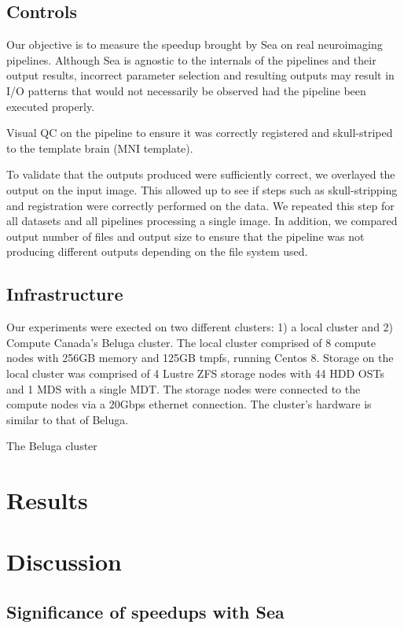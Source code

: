 \documentclass[10pt,journal,compsoc]{IEEEtran}
\begin{document}
\subsection{Controls}
Our objective is to measure the speedup brought by Sea on real neuroimaging pipelines.
Although Sea is agnostic to the internals of the pipelines and their output results, incorrect parameter
selection and resulting outputs may result in I/O patterns that would not necessarily be observed had the
pipeline been executed properly.

Visual QC on the pipeline to ensure it was correctly registered and skull-striped to the template brain (MNI template). 

To validate that the outputs produced were sufficiently correct, we overlayed the output on the input image.
This allowed up to see if steps such as skull-stripping and registration were correctly performed on the data.
We repeated this step for all datasets and all pipelines processing a single image. In addition, we compared output
number of files and output size to ensure that the pipeline was not producing different outputs depending on the file
system used.


\subsection{Infrastructure}

Our experiments were exected on two different clusters: 1) a local cluster and 2) Compute Canada's Beluga cluster.
The local cluster comprised of 8 compute nodes with 256GB memory and 125GB tmpfs, running Centos 8. Storage on the local
cluster was comprised of 4 Lustre ZFS storage nodes with 44 HDD OSTs and 1 MDS with a single MDT. The
storage nodes were connected to the compute nodes via a 20Gbps ethernet connection.
The cluster's hardware is similar to that of Beluga.

The Beluga cluster

\section{Results}


\section{Discussion}
\subsection{Significance of speedups with Sea}
\end{document}
